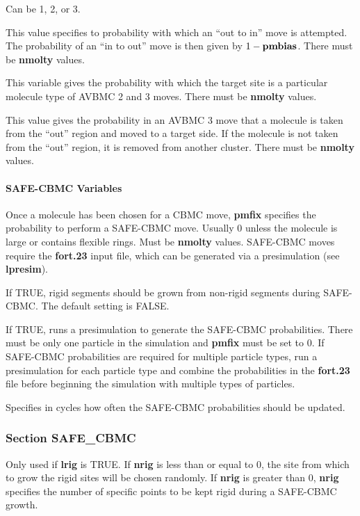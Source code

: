 \documentclass[12pt,letterpaper]{article}
\begin{document}
 Can be 1, 2, or 3.

 This value specifies to probability
with which an ``out to in'' move is attempted. The
probability of an ``in to out'' move is then given by $1 -
{\bf pmbias}$. There must be {\bf nmolty} values.

 This variable gives the probability
with which the target site is a particular molecule type of
AVBMC 2 and 3 moves. There must be {\bf nmolty} values.

 This value gives the probability in
an AVBMC 3 move that a molecule is taken from the ``out''
region and moved to a target side. If the molecule is not
taken from the ``out'' region, it is removed from another
cluster. There must be {\bf nmolty} values.

\paragraph{SAFE-CBMC Variables}

 Once a molecule has been chosen for a
CBMC move, {\bf pmfix} specifies the probability to perform
a SAFE-CBMC move. Usually 0 unless the molecule is large or
contains flexible rings. Must be {\bf nmolty} values.
SAFE-CBMC moves require the {\bf fort.23} input file, which
can be generated via a presimulation (see {\bf lpresim}).

 If TRUE, rigid segments should be grown
from non-rigid segments during SAFE-CBMC. The default
setting is FALSE.

 If TRUE, runs a presimulation to
generate the SAFE-CBMC probabilities. There must be only one
particle in the simulation and {\bf pmfix} must be set to 0.
If SAFE-CBMC probabilities are required for multiple
particle types, run a presimulation for each particle type
and combine the probabilities in the {\bf fort.23} file
before beginning the simulation with multiple types of
particles.

 Specifies in cycles how often the
SAFE-CBMC probabilities should be updated.

\subsubsection{Section \textbf{SAFE\_CBMC}}
 Only used if {\bf lrig} is TRUE. If
{\bf nrig} is less than or equal to 0, the site from which
to grow the rigid sites will be chosen randomly. If
{\bf nrig} is greater than 0, {\bf nrig} specifies the
number of specific points to be kept rigid during a
SAFE-CBMC growth.
\end{document}
